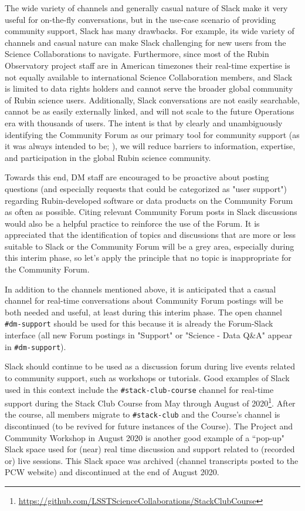 \documentclass[DM,lsstdraft,authoryear,toc]{lsstdoc}
\begin{document}
The wide variety of channels and generally casual nature of Slack make it very useful for on-the-fly conversations, but in the use-case scenario of providing community support, Slack has many drawbacks.
For example, its wide variety of channels and casual nature can make Slack challenging for new users from the Science Collaborations to navigate.
Furthermore, since most of the Rubin Observatory project staff are in American timezones their real-time expertise is not equally available to international Science Collaboration members, and Slack is limited to data rights holders and cannot serve the broader global community of Rubin science users.
Additionally, Slack conversations are not easily searchable, cannot be as easily externally linked, and will not scale to the future Operations era with thousands of users.
The intent is that by clearly and unambiguously identifying the Community Forum as our primary tool for community support (as it was always intended to be; ), we will reduce barriers to information, expertise, and participation in the global Rubin science community.

Towards this end, DM staff are encouraged to be proactive about posting questions (and especially requests that could be categorized as "user support") regarding Rubin-developed software or data products on the Community Forum as often as possible.
Citing relevant Community Forum posts in Slack discussions would also be a helpful practice to reinforce the use of the Forum.
It is appreciated that the identification of topics and discussions that are more or less suitable to Slack or the Community Forum will be a grey area, especially during this interim phase, so let's apply the principle that no topic is inappropriate for the Community Forum.

In addition to the channels mentioned above, it is anticipated that a casual channel for real-time conversations about Community Forum postings will be both needed and useful, at least during this interim phase.
The open channel {\tt \#dm-support} should be used for this because it is already the Forum-Slack interface (all new Forum postings in "Support" or "Science - Data Q\&A" appear in {\tt \#dm-support}).

Slack should continue to be used as a discussion forum during live events related to community support, such as workshops or tutorials.
Good examples of Slack used in this context include the {\tt \#stack-club-course} channel for real-time support during the Stack Club Course from May through August of 2020\footnote{\url{https://github.com/LSSTScienceCollaborations/StackClubCourse}}.
After the course, all members migrate to {\tt \#stack-club} and the Course's channel is discontinued (to be revived for future instances of the Course).
The Project and Community Workshop in August 2020 is another good example of a ``pop-up" Slack space used for (near) real time discussion and support related to (recorded or) live sessions.
This Slack space was archived (channel transcripts posted to the PCW website) and discontinued at the end of August 2020.
\end{document}

